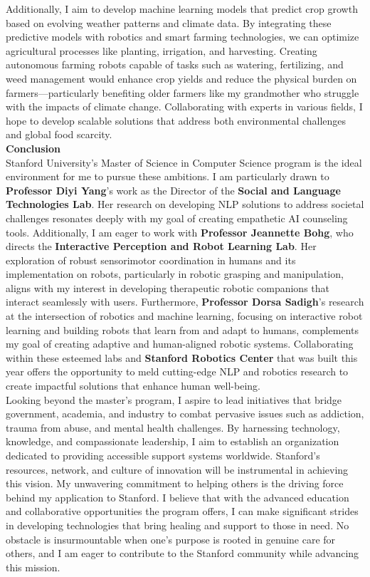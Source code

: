 \documentclass{article}
\begin{document}
Additionally, I aim to develop machine learning models that predict crop growth based on evolving weather patterns and climate data. By integrating these predictive models with robotics and smart farming technologies, we can optimize agricultural processes like planting, irrigation, and harvesting. Creating autonomous farming robots capable of tasks such as watering, fertilizing, and weed management would enhance crop yields and reduce the physical burden on farmers—particularly benefiting older farmers like my grandmother who struggle with the impacts of climate change. Collaborating with experts in various fields, I hope to develop scalable solutions that address both environmental challenges and global food scarcity.
\\

\textbf{Conclusion} \\
Stanford University's Master of Science in Computer Science program is the ideal environment for me to pursue these ambitions. I am particularly drawn to \textbf{Professor Diyi Yang}'s work as the Director of the \textbf{Social and Language Technologies Lab}. Her research on developing NLP solutions to address societal challenges resonates deeply with my goal of creating empathetic AI counseling tools. Additionally, I am eager to work with \textbf{Professor Jeannette Bohg}, who directs the \textbf{Interactive Perception and Robot Learning Lab}. Her exploration of robust sensorimotor coordination in humans and its implementation on robots, particularly in robotic grasping and manipulation, aligns with my interest in developing therapeutic robotic companions that interact seamlessly with users. Furthermore, \textbf{Professor Dorsa Sadigh}'s research at the intersection of robotics and machine learning, focusing on interactive robot learning and building robots that learn from and adapt to humans, complements my goal of creating adaptive and human-aligned robotic systems. Collaborating within these esteemed labs and \textbf{Stanford Robotics Center} that was built this year offers the opportunity to meld cutting-edge NLP and robotics research to create impactful solutions that enhance human well-being.
\\

Looking beyond the master's program, I aspire to lead initiatives that bridge government, academia, and industry to combat pervasive issues such as addiction, trauma from abuse, and mental health challenges. By harnessing technology, knowledge, and compassionate leadership, I aim to establish an organization dedicated to providing accessible support systems worldwide. Stanford's resources, network, and culture of innovation will be instrumental in achieving this vision. My unwavering commitment to helping others is the driving force behind my application to Stanford. I believe that with the advanced education and collaborative opportunities the program offers, I can make significant strides in developing technologies that bring healing and support to those in need. No obstacle is insurmountable when one's purpose is rooted in genuine care for others, and I am eager to contribute to the Stanford community while advancing this mission.
\end{document}
